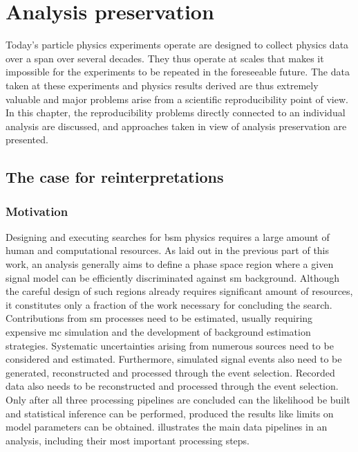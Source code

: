 
\chapter{Analysis preservation}\label{ch:preservation}

\ifpdf
    \graphicspath{{chapter-preservation/Figs/Raster/}{chapter-preservation/Figs/PDF/}{chapter-preservation/Figs/}}
\else
    \graphicspath{{chapter-preservation/Figs/Vector/}{chapter-preservation/Figs/}}
\fi

Today's particle physics experiments operate are designed to collect physics data over a span over several decades. They thus operate at scales that makes it impossible for the experiments to be repeated in the foreseeable future. The data taken at these experiments and physics results derived are thus extremely valuable and major problems arise from a scientific reproducibility point of view. In this chapter, the reproducibility problems directly connected to an individual analysis are discussed, and approaches taken in view of analysis preservation are presented.

\section{The case for reinterpretations}

\subsection{Motivation}
Designing and executing searches for \gls{bsm} physics requires a large amount of human and computational resources. As laid out in the previous part of this work, an analysis generally aims to define a phase space region where a given signal model can be efficiently discriminated against \gls{sm} background. Although the careful design of such regions already requires significant amount of resources, it constitutes only a fraction of the work necessary for concluding the search. Contributions from \gls{sm} processes need to be estimated, usually requiring expensive \gls{mc} simulation and the development of background estimation strategies. Systematic uncertainties arising from numerous sources need to be considered and estimated. Furthermore, simulated signal events also need to be generated, reconstructed and processed through the event selection. Recorded data also needs to be reconstructed and processed through the event selection. Only after all three processing pipelines are concluded can the likelihood be built and statistical inference can be performed, produced the results like \eg limits on model parameters can be obtained.  illustrates the main data pipelines in an analysis, including their most important processing steps.

